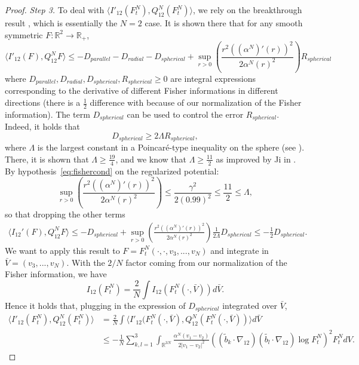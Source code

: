 \documentclass[11pt,a4paper]{article}
\theoremstyle{definition}
\theoremstyle{plain}
\begin{document}
\begin{proof}
    \textit{Step 3.} To deal with $\langle I'_{12}(F^N_t) , Q^N_{12} (F^N_t)\rangle$, we rely on the breakthrough result \cite{GuillenSilvestre2023}, which is essentially the $N=2$ case. It is shown there \cite[Lemma 8.4]{GuillenSilvestre2023} that for any smooth symmetric $F:\mathbb{R}^2 \rightarrow \mathbb{R}_+$,
    $$\langle I'_{12}(F), Q^N_{12}F\rangle \leq -D_{parallel}-D_{radial}-D_{spherical} + \sup_{r>0} \left(\frac{r^2((\alpha^N)'(r))^2}{2\alpha^N(r)^2}\right)R_{spherical}$$
    where $D_{parallel},D_{radial},D_{spherical},R_{spherical}\geq 0$ are integral expressions corresponding to the derivative of different Fisher informations in different directions (there is a $\frac{1}{2}$ difference with \cite[Lemma 8.4]{GuillenSilvestre2023} because of our normalization of the Fisher information).
    The term $D_{spherical}$ can be used to control the error $R_{spherical}$. Indeed, it holds that
    $$D_{spherical}\geq 2\Lambda R_{spherical},$$
    where $\Lambda$ is the largest constant in a Poincaré-type inequality on the sphere (see \cite[Lemma 9.1]{GuillenSilvestre2023}). There, it is shown that $\Lambda\geq \frac{19}{4}$, and we know that $\Lambda\geq \frac{11}{2}$ as improved by Ji in \cite{Ji2024a}.
    By hypothesis~\eqref{eq:fishercond} on the regularized potential:
    $$\sup_{r>0} \left(\frac{r^2((\alpha^N)'(r))^2}{2\alpha^N(r)^2}\right)\leq\frac{\gamma^2}{2(0.99)^2}\leq \frac{11}{2} \leq \Lambda, $$
    so that dropping the other terms
    \begin{align}
    \label{eq:boundwith1/2}
        \langle I_{12}'(F), Q^N_{12}F\rangle \leq -D_{spherical} + \sup_{r>0} \left(\frac{r^2((\alpha^N)'(r))^2}{2\alpha^N(r)^2}\right)\frac{1}{2\Lambda}D_{spherical}\leq -\frac{1}{2}D_{spherical}.
    \end{align}
    We want to apply this result to $F=F^N_t(\cdot,\cdot,v_3,...,v_N)$ and integrate in $\bar{V}=(v_3,...,v_N)$.
    With the $2/N$ factor coming from our normalization of the Fisher information, we have
    $$I_{12}(F^N_t) =\frac{2}{N}\int I_{12}(F^N_t(\cdot,\bar{V})) d\bar{V}.$$
    Hence it holds that, plugging in the expression of $D_{spherical}$ \cite[(8.3)]{GuillenSilvestre2023} integrated over $\bar{V}$,
    \begin{align*}
        \langle I'_{12}(F^N_t) , Q^N_{12} (F^N_t)\rangle&=\frac{2}{N}\int\langle I'_{12}(F^N_t(\cdot,\bar{V}) , Q^N_{12} (F^N_t(\cdot,\bar{V}))\rangle d\bar{V}\\
        &\leq- \frac{1}{N} \sum_{k,l=1}^3 \int_{\mathbb{R}^{3N}} \frac{\alpha^N(v_1-v_2)}{2\vert v_1-v_2 \vert^2} \left( (\tilde{b}_k\cdot \nabla_{12})( \tilde{b_l}\cdot \nabla_{12})\log F^N_t \right)^2 F^N_t dV.

\end{align*}
\end{proof}
\end{document}
